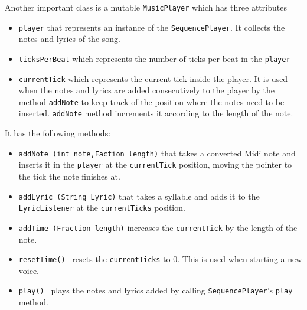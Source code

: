 \documentclass[12pt]{book}
\begin{document}
\medskip
Another important class is a mutable {\tt MusicPlayer} which has three attributes 
\begin{itemize} 
\item { \tt player} that represents an instance of the {\tt SequencePlayer}. It collects the notes and lyrics of the song.
\item { \tt ticksPerBeat} which represents the number of ticks per beat in the {\tt player}
\item { \tt currentTick} which represents the current tick inside the player. It is used when the notes and lyrics are added consecutively to the player by the method {\tt addNote} to keep track of the position  where the notes need to be inserted. {\tt addNote} method increments it according to the length of the note.
\end{itemize}
It has the following methods:
\begin{itemize} 
\item { \tt addNote (int note,Faction length)} that takes a converted Midi note and inserts it in the {\tt player} at the {\tt currentTick} position, moving the pointer to the tick the note finishes at.
\item { \tt addLyric (String Lyric)} that takes a syllable and adds it to the {\tt LyricListener} at the {\tt currentTicks} position.
\item { \tt addTime (Fraction length)} increases the {\tt currentTick} by the length of the note.
\item { \tt resetTime() } resets the {\tt currentTicks} to 0. This is used when starting a new voice.
\item { \tt play() } plays the notes and lyrics added by calling {\tt SequencePlayer}'s {\tt play} method. 
\end{itemize}

\bigskip


\bigskip
\end{document}
